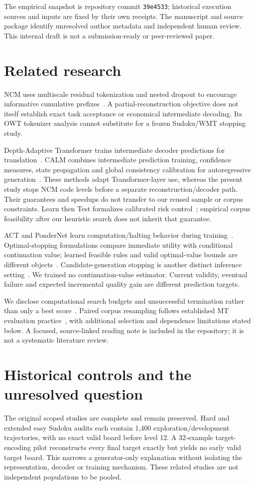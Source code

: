 \documentclass[11pt]{article}
\begin{document}
The empirical snapshot is repository commit \texttt{39e4533}; historical execution sources and inputs are fixed by their own receipts. The manuscript and source package identify unresolved author metadata and independent human review. This internal draft is not a submission-ready or peer-reviewed paper.

\section{Related research}
NCM uses multiscale residual tokenization and nested dropout to encourage informative cumulative prefixes~\cite{ncm}. A partial-reconstruction objective does not itself establish exact task acceptance or economical intermediate decoding. Its OWT tokenizer analysis cannot substitute for a frozen Sudoku/WMT stopping study.

Depth-Adaptive Transformer trains intermediate decoder predictions for translation~\cite{dat}. CALM combines intermediate prediction training, confidence measures, state propagation and global consistency calibration for autoregressive generation~\cite{calm}. These methods adapt Transformer-layer use, whereas the present study stops NCM code levels before a separate reconstruction/decoder path. Their guarantees and speedups do not transfer to our reused sample or corpus constraints. Learn then Test formalizes calibrated risk control~\cite{ltt}; empirical corpus feasibility after our heuristic search does not inherit that guarantee.

ACT and PonderNet learn computation/halting behavior during training~\cite{act,ponder}. Optimal-stopping formulations compare immediate utility with conditional continuation value; learned feasible rules and valid optimal-value bounds are different objects~\cite{optimal}. Candidate-generation stopping is another distinct inference setting~\cite{bestn}. We trained no continuation-value estimator. Current validity, eventual failure and expected incremental quality gain are different prediction targets.

We disclose computational search budgets and unsuccessful termination rather than only a best score~\cite{reporting}. Paired corpus resampling follows established MT evaluation practice~\cite{koehn}, with additional selection and dependence limitations stated below. A focused, source-linked reading note is included in the repository; it is not a systematic literature review.

\section{Historical controls and the unresolved question}
The original scoped studies are complete and remain preserved. Hard and extended easy Sudoku audits each contain 1,400 exploration/development trajectories, with no exact valid board before level 12. A 32-example target-encoding pilot reconstructs every final target exactly but yields no early valid target board. This narrows a generator-only explanation without isolating the representation, decoder or training mechanism. These related studies are not independent populations to be pooled.
\end{document}
